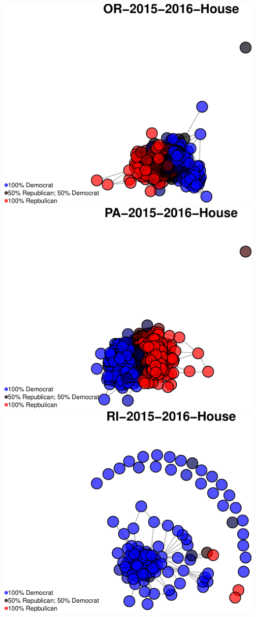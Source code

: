 \documentclass[]{article}
\begin{document}
\includegraphics{Final_Project_RMarkdown_Updated_files/figure-latex/unnamed-chunk-10-31.pdf}
\includegraphics{Final_Project_RMarkdown_Updated_files/figure-latex/unnamed-chunk-10-32.pdf}
\includegraphics{Final_Project_RMarkdown_Updated_files/figure-latex/unnamed-chunk-10-33.pdf}
\end{document}
